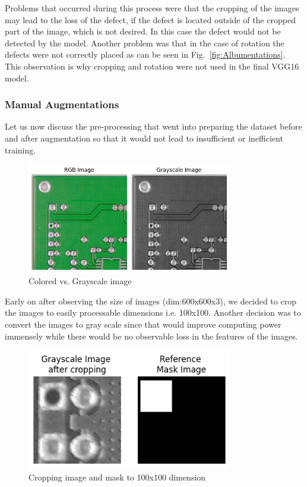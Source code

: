 \documentclass[12pt]{article}
\begin{document}
Problems that occurred during this process were that the cropping of the images may lead to the loss of the defect, if the defect is located outside of the cropped part of the image, which is not desired.
In this case the defect would not be detected by the model. Another problem was that in the case of rotation the defects were not correctly placed as can be seen in Fig.~\ref{fig:Albumentations}. This observation is why cropping and rotation were not used in the final VGG16 model.

\subsubsection{Manual Augmentations}
Let us now discuss the pre-processing that went into preparing the dataset before and after augmentation so that it would not lead to insufficient or inefficient training.

\begin{figure}[h]
    \centering
    \includegraphics[width=0.8\textwidth]{./graphics/rgb vs grayscale.png}
    \caption{Colored vs. Grayscale image}
    \label{fig:Rgb_gray}
\end{figure}

Early on after observing the size of images (dim:600x600x3), we decided to crop the images to easily processable dimensions i.e. 100x100. Another decision was to convert the images to gray scale since that would improve computing power immensely while there would be no observable loss in the features of the images.

\begin{figure}[h]
    \centering
    \includegraphics[width=0.8\textwidth]{./graphics/croppedimagewithmask.png}
    \caption{Cropping image and mask to 100x100 dimension}
    \label{fig:croppedimagewithmask}
\end{figure}
\end{document}
